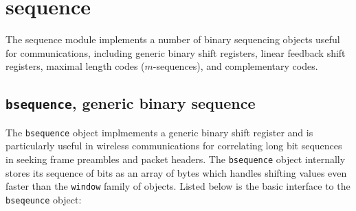 % 
%

\newpage
\section{sequence}
\label{module:sequence}
The sequence module implements a number of binary sequencing objects
useful for communications,
including
generic binary shift registers,
linear feedback shift registers,
maximal length codes ($m$-sequences),
and
complementary codes.

\subsection{{\tt bsequence}, generic binary sequence}
\label{module:sequence:bsequence}
The {\tt bsequence} object implmements a generic binary shift register
and is particularly useful in wireless communications for correlating long
bit sequences in seeking frame preambles and packet headers.
The {\tt bsequence} object internally stores its sequence of bits as an array
of bytes which handles shifting values even faster than the {\tt window}
family of objects.
%
Listed below is the basic interface to the {\tt bseqeunce} object:
%
